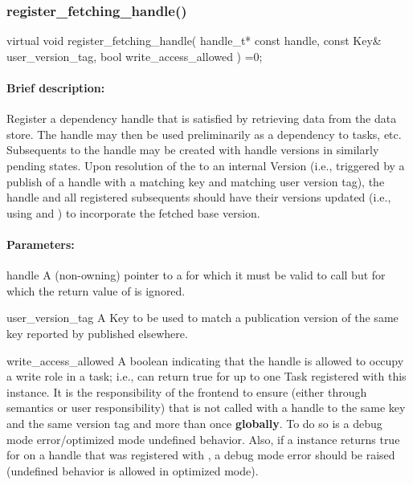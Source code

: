 \subsubsection{register\_fetching\_handle()}
\begin{CppCode}
    virtual void
    register_fetching_handle(
      handle_t* const handle,
      const Key& user_version_tag,
      bool write_access_allowed
    ) =0;
\end{CppCode}

\paragraph{Brief description:} Register a dependency handle that is satisfied by retrieving data from the data store.
       The handle may then be used preliminarily as a dependency to tasks, etc.  Subsequents to the handle
       may be created with handle versions in similarly pending states.  Upon resolution of the 
       to an internal Version (i.e., triggered by a publish of a handle with a matching key and matching user
       version tag), the handle and all registered subsequents should have their versions updated (i.e., using
        and ) to incorporate the fetched base version.
     
\paragraph{Parameters:}
\begin{compactdesc} 
\item[handle] A (non-owning) pointer to a  for which it must be valid to call 
     but for which the return value of  is ignored.
     
\item[user\_version\_tag] A Key to be used to match a publication version of the same key reported
       by  published elsewhere.
     
\item[write\_access\_allowed] A boolean indicating that the handle is allowed to occupy a write role in
       a task; i.e.,  can return true for up to one Task  registered with this instance.
       It is the responsibility of the frontend to ensure (either through semantics or user responsibility) that
        is not called with a handle to the same key and the same version tag and
        more than once {\bf globally}.  To do so is a debug mode error/optimized mode
       undefined behavior.  Also, if a  instance returns true for 
       on a handle that was registered with , a debug mode error should be raised
       (undefined behavior is allowed in optimized mode).
\end{compactdesc}
     
